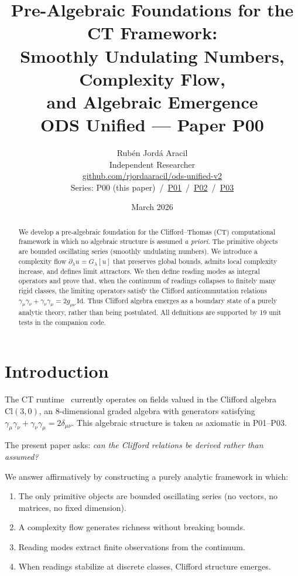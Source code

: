 \documentclass[11pt,a4paper]{article}
\title{\textbf{Pre-Algebraic Foundations for the CT Framework:\\
Smoothly Undulating Numbers, Complexity Flow,\\
and Algebraic Emergence}\\[6pt]
\large ODS Unified --- Paper P00}
\author{Rub\'en Jord\'a Aracil\\
  \small Independent Researcher\\
  \small \href{https://github.com/rjordaaracil/ods-unified-v2}{github.com/rjordaaracil/ods-unified-v2}\\[4pt]
  \small Series:
  P00 (this paper)
  \,/\, \href{https://doi.org/10.5281/zenodo.18995428}{P01}
  \,/\, \href{https://doi.org/10.5281/zenodo.15078277}{P02}
  \,/\, \href{https://doi.org/10.5281/zenodo.19202918}{P03}
}
\date{March 2026}
\begin{document}
\maketitle

\begin{abstract}
We develop a pre-algebraic foundation for the Clifford--Thomas (CT)
computational framework in which no algebraic structure is assumed
\emph{a priori}. The primitive objects are bounded oscillating series
(smoothly undulating numbers). We introduce a complexity flow
$\partial_\lambda u = G_\lambda[u]$ that preserves global bounds,
admits local complexity increase, and defines limit attractors.
We then define reading modes as integral operators and prove that,
when the continuum of readings collapses to finitely many rigid classes,
the limiting operators satisfy the Clifford anticommutation relations
$\gamma_\mu\gamma_\nu + \gamma_\nu\gamma_\mu = 2g_{\mu\nu}\,\mathrm{Id}$.
Thus Clifford algebra emerges as a boundary state of a purely analytic
theory, rather than being postulated. All definitions are supported by
19 unit tests in the companion code.
\end{abstract}

\section{Introduction}

The CT runtime~\cite{zenodo_p01,zenodo_p02,zenodo_p03} currently operates
on fields valued in the Clifford algebra $\mathrm{Cl}(3,0)$, an 8-dimensional
graded algebra with generators satisfying
$\gamma_\mu\gamma_\nu + \gamma_\nu\gamma_\mu = 2\delta_{\mu\nu}$.
This algebraic structure is taken as axiomatic in P01--P03.

The present paper asks: \emph{can the Clifford relations be derived
rather than assumed?}

We answer affirmatively by constructing a purely analytic framework
in which:
\begin{enumerate}
\item The only primitive objects are bounded oscillating series
      (no vectors, no matrices, no fixed dimension).
\item A complexity flow generates richness without breaking bounds.
\item Reading modes extract finite observations from the continuum.
\item When readings stabilize at discrete classes, Clifford structure emerges.
\end{enumerate}
\end{document}
